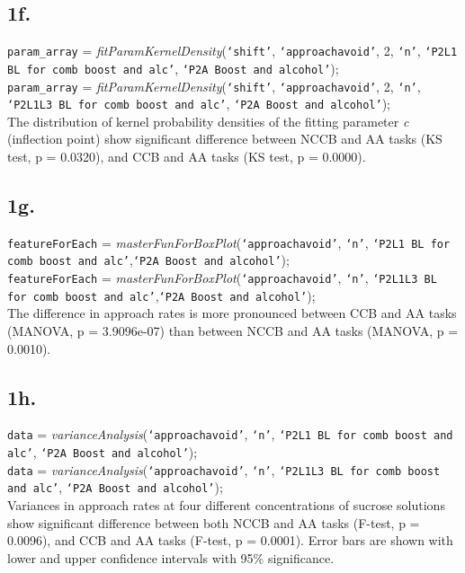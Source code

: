 \documentclass{article}
\begin{document}
\subsection{1f.}
\texttt{param\_array} = \emph{fitParamKernelDensity}(\texttt{`shift'}, \texttt{`approachavoid'}, 2, \texttt{`n'}, \texttt{`P2L1 BL for comb boost and alc'}, \texttt{`P2A Boost and alcohol'});\\
\texttt{param\_array} = \emph{fitParamKernelDensity}(\texttt{`shift'}, \texttt{`approachavoid'}, 2, \texttt{`n'}, \texttt{`P2L1L3 BL for comb boost and alc'}, \texttt{`P2A Boost and alcohol'});\\

The distribution of kernel probability densities of the fitting parameter \emph{c} (inflection point) show significant difference between NCCB and AA tasks (KS test, p = 0.0320), and CCB and AA tasks (KS test, p = 0.0000).\\

\subsection{1g.}
\texttt{featureForEach} = \emph{masterFunForBoxPlot}(\texttt{`approachavoid'}, \texttt{`n'}, \texttt{`P2L1 BL for comb boost and alc'},\texttt{`P2A Boost and alcohol'});\\
\texttt{featureForEach} = \emph{masterFunForBoxPlot}(\texttt{`approachavoid'}, \texttt{`n'}, \texttt{`P2L1L3 BL for comb boost and alc'},\texttt{`P2A Boost and alcohol'});\\


The difference in approach rates is more pronounced between CCB and AA tasks (MANOVA, p = 3.9096e-07) than between NCCB and AA tasks (MANOVA, p = 0.0010).

\subsection{1h.}
\texttt{data} = \emph{varianceAnalysis}(\texttt{`approachavoid'}, \texttt{`n'}, \texttt{`P2L1 BL for comb boost and alc'}, \texttt{`P2A Boost and alcohol'});\\
\texttt{data} = \emph{varianceAnalysis}(\texttt{`approachavoid'}, \texttt{`n'}, \texttt{`P2L1L3 BL for comb boost and alc'}, \texttt{`P2A Boost and alcohol'});\\

Variances in approach rates at four different concentrations of sucrose solutions show significant difference between both NCCB and AA tasks (F-test, p = 0.0096), and CCB and AA tasks (F-test, p = 0.0001). Error bars are shown with lower and upper confidence intervals with 95\% significance.
\end{document}
